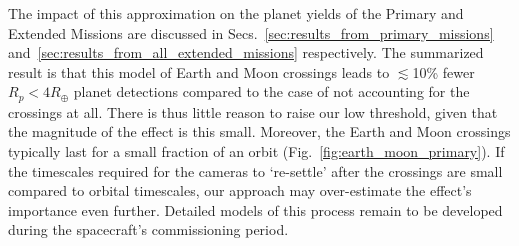 The impact of this approximation on the planet yields of the Primary and 
Extended Missions are discussed in 
Secs.~\ref{sec:results_from_primary_missions} and~\ref{sec:results_from_all_extended_missions}
 respectively.
The summarized result is that this model of Earth and Moon crossings leads to $\lesssim$10\% fewer $R_p<4R_\oplus$ planet detections compared to the case of not accounting for the crossings at all.
There is thus little reason to raise our low threshold, given that the magnitude of the effect is this small.
Moreover, the Earth and Moon crossings typically last for a small fraction of an orbit (Fig.~\ref{fig:earth_moon_primary}). If the timescales required for the cameras to `re-settle' after the crossings are small compared to orbital timescales, our approach may over-estimate the effect's importance even further.
Detailed models of this process remain to be developed during the spacecraft's 
commissioning period.











